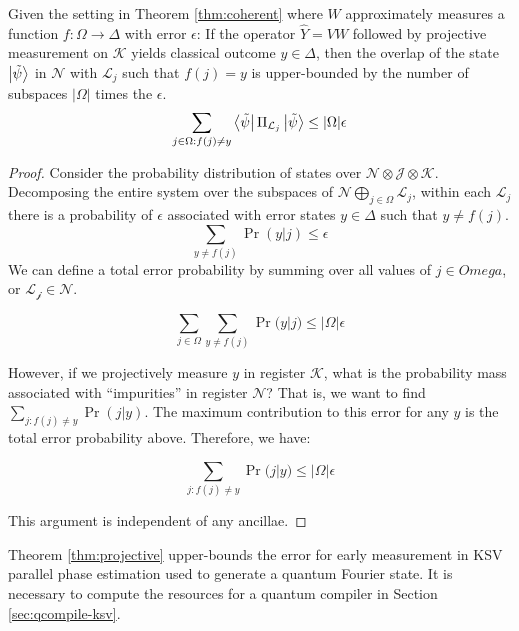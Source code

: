\begin{theorem}
Given the setting in Theorem \ref{thm:coherent}
where $W$ approximately measures a function $f : \Omega \rightarrow \Delta$
with error $\epsilon$: If the operator $\hat{Y} = VW$ followed by projective
measurement on $\mathcal{K}$ yields classical outcome $y \in \Delta$,
then the
overlap of the state $\left\vert{\tilde{\psi}}\right\rangle$ in $\mathcal{N}$ with $\mathcal{L}_j$ such
that $f(j) = y$ is upper-bounded by the number of subspaces $|\Omega|$ times the
$\epsilon$.
%
\begin{equation}
\sum_{j \in \Omega: f(j) \ne y} \left\langle{\tilde{\psi}}\right\vert\Pi_{\mathcal{L}_j}\left\vert{\tilde{\psi}}\right\rangle \le |\Omega|\epsilon
\end{equation}
\label{thm:projective}
\end{theorem}
%
\begin{proof}
Consider the probability distribution of states over $\mathcal{N} \otimes \mathcal{J} \otimes \mathcal{K}$.
Decomposing the entire system over the subspaces of $\mathcal{N} \bigoplus_{j \in \Omega} \mathcal{L}_j$,
within each $\mathcal{L}_j$ there is a probability of $\epsilon$ associated with error states $y \in \Delta$
such that $y \ne f(j)$.
%
\begin{equation}
\sum_{y \ne f(j)} \Pr(y | j) \le \epsilon
\end{equation}
%
We can define a total error probability by summing over all values of $j \in Omega$, or
$\mathcal{L_j} \in \mathcal{N}$.

\begin{equation}
\sum_{j \in \Omega} \sum_{y \ne f(j)} \Pr(y | j) \le |\Omega|\epsilon
\end{equation}

However, if we projectively measure $y$ in register $\mathcal{K}$, what is the probability
mass associated with ``impurities'' in register $\mathcal{N}$? That is, we want to
find $\sum_{j: f(j) \ne y} \Pr(j | y)$. The maximum contribution to this error for
any $y$ is the total error probability above. Therefore, we have:

\begin{equation}
\sum_{j: f(j) \ne y} \Pr(j | y) \le |\Omega|\epsilon
\end{equation}

This argument is independent of any ancillae.
\end{proof}

Theorem \ref{thm:projective} upper-bounds the error for
early measurement in KSV parallel phase estimation used to
generate a quantum Fourier state. It is necessary to compute the resources
for a quantum compiler in Section \ref{sec:qcompile-ksv}.